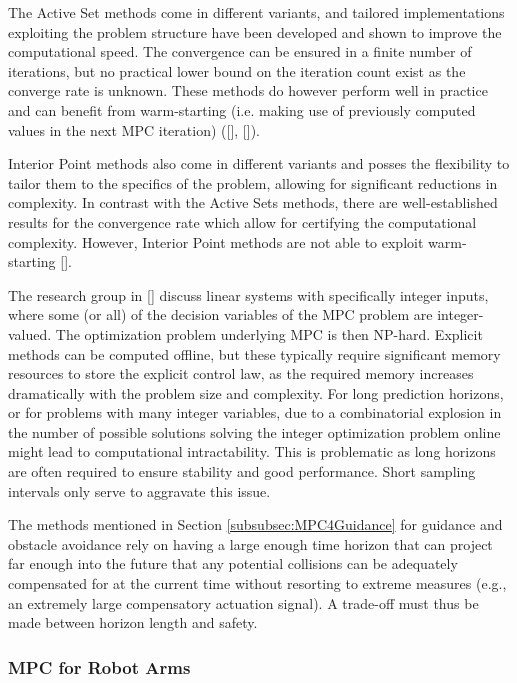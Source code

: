 The Active Set methods come in different variants, and tailored implementations exploiting the problem structure have been developed and shown to improve the computational speed. The convergence can be ensured in a finite number of iterations, but no practical lower bound on the iteration count exist as the converge rate is unknown. These methods do however perform well in practice and can benefit from warm-starting (i.e. making use of previously computed values in the next \gls{MPC} iteration) ([\citeauthor{Shahzad2008}], [\citeauthor{Richter2012}]).

Interior Point methods also come in different variants and posses the flexibility to tailor them to the specifics of the problem, allowing for significant reductions in complexity. In contrast with the Active Sets methods, there are well-established results for the convergence rate which allow for certifying the computational complexity. However, Interior Point methods are not able to exploit warm-starting [\citeauthor{Shahzad2008}].

The research group in [\citeauthor{Karamanakos2016}] discuss linear systems with specifically integer inputs, where some (or all) of the decision variables of the \gls{MPC} problem are integer-valued. The optimization problem underlying \gls{MPC} is then NP-hard. Explicit methods can be computed offline, but these typically require significant memory resources to store the explicit control law, as the required memory increases dramatically with the problem size and complexity. For long prediction horizons, or for problems with many integer variables, due to a combinatorial explosion in the number of possible solutions solving the integer optimization problem online might lead to computational intractability. This is problematic as long horizons are often required to ensure  stability and good performance. Short sampling intervals only serve to aggravate this issue.

The methods mentioned in Section \ref{subsubsec:MPC4Guidance} for guidance and obstacle avoidance rely on having a large enough time horizon that can project far enough into the future that any potential collisions can be adequately compensated for at the current time without resorting to extreme measures (e.g., an extremely large compensatory actuation signal). A trade-off must thus be made between horizon length and safety.

\subsubsection{MPC for Robot Arms}

